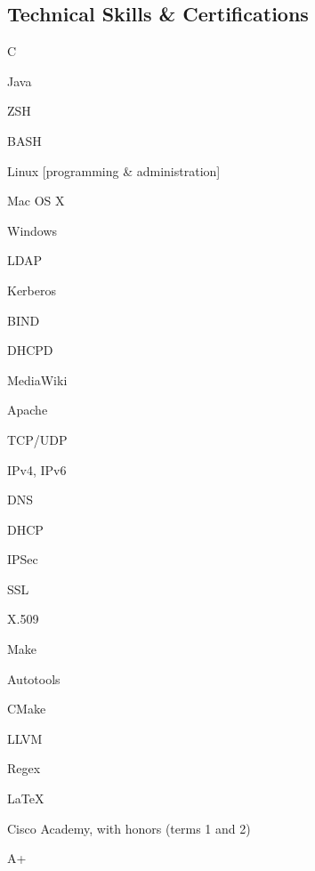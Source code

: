 \documentclass[a4paper,margin,line]{resume}
\begin{document}
\begin{resume}
\section{\mysidestyle Technical Skills \& Certifications}
	\begin{compactdesc}
		\item[Fluent Languages] \begin{inparaenum} { \small
			\item C
			\item Java
			\item ZSH
			\item BASH
		} \end{inparaenum}
		\item[Operating Systems] \begin{inparaenum} { \small
			\item Linux [programming \& administration]
			\item Mac OS X
			\item Windows
		} \end{inparaenum}
		\item[Server Administration] \begin{inparaenum} { \small
			\item LDAP
			\item Kerberos
			\item BIND
			\item DHCPD
			\item MediaWiki
			\item Apache
		} \end{inparaenum}
		\item[Networking] \begin{inparaenum} { \small
			\item TCP/UDP
			\item IPv4, IPv6
			\item DNS
			\item DHCP
			\item IPSec
			\item SSL
			\item X.509
		} \end{inparaenum}
		\item[Tools] \begin{inparaenum} { \small
			\item Make
			\item Autotools
			\item CMake
			\item LLVM
			\item Regex
			\item \LaTeX
		} \end{inparaenum}
		\item[Certifications] \begin{inparaenum} { \small
			\item Cisco Academy, with honors (terms 1 and 2)
			\item A+
		} \end{inparaenum}
	\end{compactdesc}


\end{resume}
\end{document}
